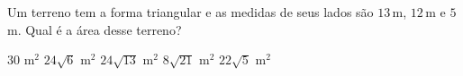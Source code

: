 \noindent\parbox{\linewidth}{

Um terreno tem a forma triangular e as medidas de seus lados são $13$\,m, $12$\,m e $5$\,m. Qual é a área desse terreno?

$30$ m$^2$
$24\sqrt{6}$ m$^2$
$24\sqrt{13}$ m$^2$
$8\sqrt{21}$ m$^2$
$22\sqrt{5}$ m$^2$



}


